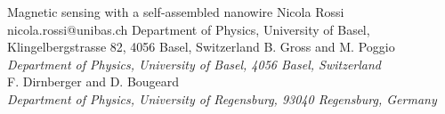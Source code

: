 \begin{conf-abstract}[]
{Magnetic sensing with a self-assembled nanowire}
{\color{blue} Nicola Rossi}
{nicola.rossi@unibas.ch}
{Department of Physics, University of Basel, Klingelbergstrasse 82, 4056 Basel, Switzerland}
{{\color{blue}B. Gross and M. Poggio}\\ \textit{Department of Physics, University of Basel, 4056 Basel, Switzerland}\\ 
{\color{blue}F. Dirnberger and D. Bougeard}\\ \textit{ Department of Physics, University of Regensburg, 93040 Regensburg, Germany}\\ 
\decofourleft \decofourright}





\printbibliography[heading=none]

\end{conf-abstract}
